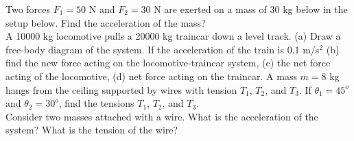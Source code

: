 \documentclass[12pt]{article}
\begin{document}
\noindent Two forces $F_1 = 50$ N and $F_2 = 30$ N are exerted on a mass of 30 kg below in the setup below.  Find the acceleration of the mass? 
%
\\
\resizebox{8cm}{!}{}
\newpage
\noindent A 10000 kg locomotive pulls a 20000 kg traincar down a level track.  (a) Draw a free-body diagram of the system. If the acceleration of the train is 0.1 m/s$^2$ (b) find the new force acting on the locomotive-traincar system, (c) the net force acting of the locomotive, (d) net force acting on the traincar.
\newpage
\noindent A mass $m=8$ kg hangs from the ceiling supported by wires with tension $T_1$, $T_2$, and $T_3$.  If $\theta_1 = 45^o$ and $\theta_2=30^o$, find the tensions $T_1$, $T_2$, and $T_3$.\\
\resizebox{12cm}{!}{}
\newpage
\noindent Consider two masses attached with a wire.  What is the acceleration of the system?  What is the tension of the wire?\\
\resizebox{12cm}{!}{}
\newpage
\noindent
\end{document}
